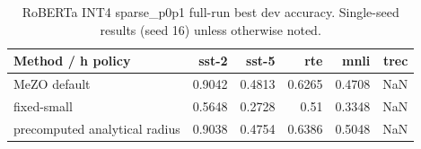 \begin{table}[t]
\centering
\begin{tabular}{lrrrrr}
\toprule
Method / h policy & sst-2 & sst-5 & rte & mnli & trec \\
\midrule
MeZO default & 0.9042 & 0.4813 & 0.6265 & 0.4708 & NaN \\
fixed-small & 0.5648 & 0.2728 & 0.51 & 0.3348 & NaN \\
precomputed analytical radius & 0.9038 & 0.4754 & 0.6386 & 0.5048 & NaN \\
\bottomrule
\end{tabular}

\caption{RoBERTa INT4 sparse_p0p1 full-run best dev accuracy. Single-seed results (seed 16) unless otherwise noted.}
\label{tab:roberta_int4_sparse_p0p1}
\end{table}
